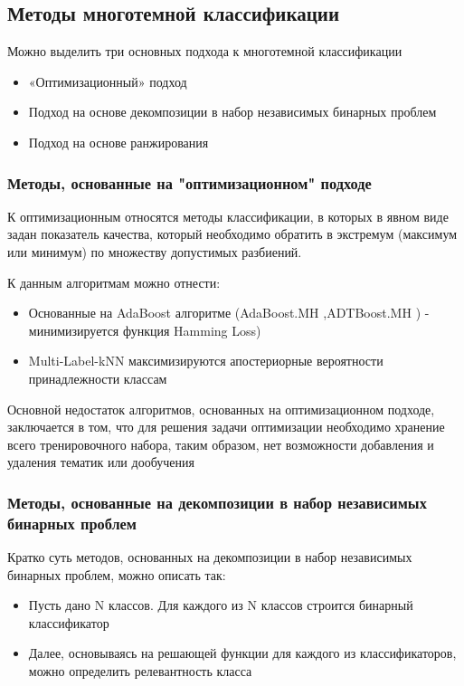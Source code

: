 \documentclass[russian, utf8, emptystyle]{eskdtext}
\begin{document}
\subsection{Методы многотемной классификации}
Можно выделить три основных подхода к многотемной классификации
\begin{itemize}
	\item «Оптимизационный» подход 
	\item Подход на основе декомпозиции в набор независимых бинарных проблем 
	\item Подход на основе ранжирования
\end{itemize}
	\subsubsection{Методы, основанные на "оптимизационном"  подходе}
	К оптимизационным относятся методы классификации, в которых в явном виде задан показатель качества, который необходимо обратить в экстремум (максимум или минимум) по множеству допустимых разбиений.

	К данным алгоритмам можно отнести:
	\begin{itemize}
		\item Основанные на AdaBoost алгоритме (AdaBoost.MH \cite{AdaBoost},ADTBoost.MH \cite{ADT}) - минимизируется функция Hamming Loss)
		\item Multi-Label-kNN \cite{kNN} максимизируются апостериорные вероятности принадлежности классам
	\end{itemize}

	Основной недостаток алгоритмов, основанных на оптимизационном подходе, заключается в том, что для решения задачи оптимизации необходимо хранение всего тренировочного набора, таким образом, нет возможности добавления и удаления тематик или дообучения
	\subsubsection{Методы, основанные на декомпозиции в набор независимых бинарных проблем}
	Кратко суть методов, основанных на декомпозиции в набор независимых бинарных проблем, можно описать так:
	\begin{itemize}
		\item Пусть дано N классов. Для каждого из N классов строится бинарный классификатор
		\item Далее, основываясь на решающей функции для каждого из классификаторов, можно определить релевантность класса
	\end{itemize}
	
\end{document}
